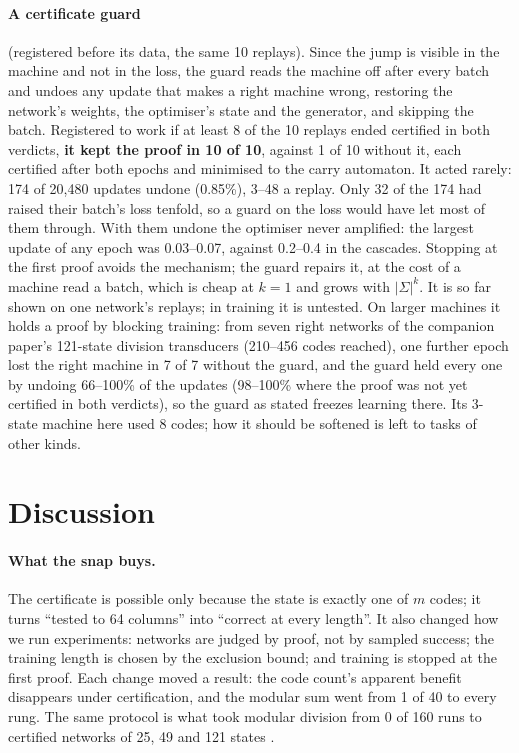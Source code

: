 \documentclass[11pt]{article}
\begin{document}
\paragraph{A certificate guard} (registered before its data, the same 10 replays). Since the jump is
visible in the machine and not in the loss, the guard reads the machine off after every batch and
undoes any update that makes a right machine wrong, restoring the network's weights, the
optimiser's state and the generator, and skipping the batch. Registered to work if at least 8 of
the 10 replays ended certified in both verdicts, \textbf{it kept the proof in 10 of 10}, against 1
of 10 without it, each certified after both epochs and minimised to the carry automaton. It acted
rarely: 174 of 20{,}480 updates undone (0.85\%), 3--48 a replay. Only 32 of the 174 had raised their
batch's loss tenfold, so a guard on the loss would have let most of them through. With them undone
the optimiser never amplified: the largest update of any epoch was 0.03--0.07, against 0.2--0.4 in
the cascades. Stopping at the first proof avoids the mechanism; the guard repairs it, at the cost of
a machine read a batch, which is cheap at $k = 1$ and grows with $|\Sigma|^k$. It is so far shown on
one network's replays; in training it is untested. On larger machines it holds a proof by blocking
training: from seven right networks of the companion paper's 121-state division transducers (210--456
codes reached), one further epoch lost the right machine in 7 of 7 without the guard, and the guard
held every one by undoing 66--100\% of the updates (98--100\% where the proof was not yet certified
in both verdicts), so the guard as stated freezes learning there. Its 3-state machine here used 8
codes; how it should be softened is left to tasks of other kinds.

\section{Discussion}

\paragraph{What the snap buys.} The certificate is possible only because the state is exactly one
of $m$ codes; it turns ``tested to 64 columns'' into ``correct at every length''. It also changed how we run experiments: networks are judged by proof, not by
sampled success; the training length is chosen by the exclusion bound; and training is stopped at
the first proof. Each change moved a result: the code count's apparent benefit disappears under
certification, and the modular sum went from 1 of 40 to every rung. The same protocol is what took
modular division from 0 of 160 runs to certified networks of 25, 49 and 121 states
\citep{barkhuizen-2026-certified-modular-division}.
\end{document}
